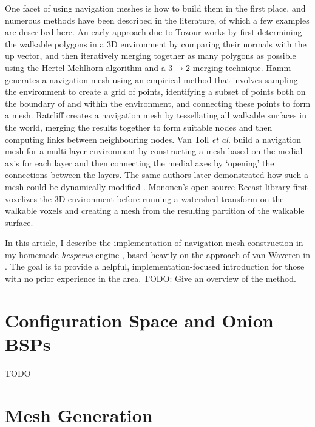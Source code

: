 \documentclass[10pt,twocolumn]{article}
\begin{document}
One facet of using navigation meshes is how to build them in the first place, and numerous methods have been described in the literature, of which a few examples are described here. An early approach due to Tozour \cite{tozour02} works by first determining the walkable polygons in a 3D environment by comparing their normals with the up vector, and then iteratively merging together as many polygons as possible using the Hertel-Mehlhorn algorithm \cite{hertel83,orourke94} and a $3 \rightarrow 2$ merging technique. Hamm \cite{hamm08} generates a navigation mesh using an empirical method that involves sampling the environment to create a grid of points, identifying a subset of points both on the boundary of and within the environment, and connecting these points to form a mesh. Ratcliff \cite{ratcliff08} creates a navigation mesh by tessellating all walkable surfaces in the world, merging the results together to form suitable nodes and then computing links between neighbouring nodes. Van Toll \emph{et al.} \cite{vantoll11} build a navigation mesh for a multi-layer environment by constructing a mesh based on the medial axis for each layer and then connecting the medial axes by `opening' the connections between the layers. The same authors later demonstrated how such a mesh could be dynamically modified \cite{vantoll12}. Mononen's open-source Recast library \cite{mononen09} first voxelizes the 3D environment before running a watershed transform \cite{beucher90,gonzalez02} on the walkable voxels and creating a mesh from the resulting partition of the walkable surface.


In this article, I describe the implementation of navigation mesh construction in my homemade \emph{hesperus} engine \cite{hesperus}, based heavily on the approach of van Waveren in \cite{vanwaveren01}. The goal is to provide a helpful, implementation-focused introduction for those with no prior experience in the area. TODO: Give an overview of the method.

\section*{Configuration Space and Onion BSPs}

TODO

\section*{Mesh Generation}
\end{document}
